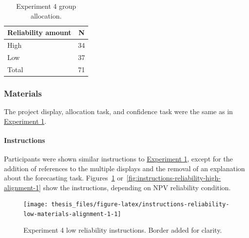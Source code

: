 \documentclass[a4paper, nobind, dvipsnames]{templates/ociamthesis}
\theoremstyle{definition}
\theoremstyle{definition}
\theoremstyle{definition}
\theoremstyle{definition}
\theoremstyle{remark}
\begin{document}
\begin{table}[tbp]

\begin{center}
\begin{threeparttable}

\caption{\label{tab:condition-allocation-alignment-1}Experiment 4 group allocation.}

\begin{tabular}{ll}
\toprule
Reliability amount & \multicolumn{1}{c}{N}\\
\midrule
High & 34\\
Low & 37\\
Total & 71\\
\bottomrule
\end{tabular}

\end{threeparttable}
\end{center}

\end{table}

\subsubsection{Materials}

The project display, allocation task, and confidence task were the same as in
\protect\hyperlink{materials-alignment-2}{Experiment 1}.

\paragraph{Instructions}

Participants were shown similar instructions to \protect\hyperlink{instructions-materials-alignment-2}{Experiment
1}, except for the addition of references
to the multiple displays and the removal of an explanation about the forecasting
task. Figures~\ref{fig:instructions-reliability-low-materials-alignment-1}
or~\ref{fig:instructions-reliability-high-alignment-1} show the instructions,
depending on NPV reliability condition.



\begin{figure}
\texttt{[image: thesis\_files/figure-latex/instructions-reliability-low-materials-alignment-1-1]} \caption{Experiment 4 low reliability instructions. Border added for clarity.}\label{fig:instructions-reliability-low-materials-alignment-1}
\end{figure}
\end{document}
